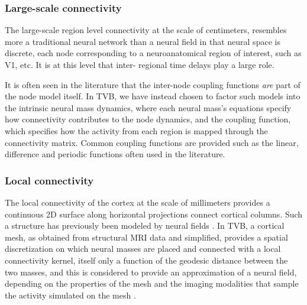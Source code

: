 	\subsubsection{Large-scale connectivity}

	The large-scale region level connectivity at the scale of centimeters,
	resembles more a traditional neural network than a neural field in that
	neural space is discrete,  each node corresponding to a neuroanatomical
	region of interest, such as V1, etc. It is at this level that inter-
	regional time delays play a large role.

	It is often seen in the literature that the inter-node coupling functions
	\textit{are} part of the node model itself. In TVB, we have instead 
	chosen to factor such models into the intrinsic neural mass dynamics, where each 
	neural mass's equations specify how connectivity contributes to the
	node dynamics, and the coupling function, which specifies how the activity
	from each region is mapped through the connectivity matrix. Common coupling 
	functions are provided such as the linear, difference and periodic functions
	often used in the literature.

	\subsubsection{Local connectivity}

	The local connectivity of the cortex at the scale of millimeters provides
	a continuous 2D surface along horizontal projections connect 
	cortical columns. Such a structure has previously been modeled by
	neural fields \cite{Amari_1977, Jirsa_1997, Liley_1999}. In TVB, a cortical mesh, 
	as obtained from structural MRI data and simplified, provides a spatial 
	discretization on which neural masses are placed and connected with a
	local connectivity kernel, itself only a function of the geodesic distance
	between the two masses, and this is considered to provide an
	approximation of a neural field, depending on the properties
	of the mesh and the imaging modalities that sample the activity simulated
	on the mesh \cite{Spiegler_2013}. 

